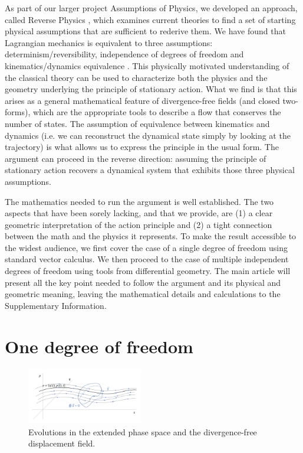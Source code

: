 \documentclass[fleqn,10pt]{wlscirep}
\begin{document}
As part of our larger project Assumptions of Physics, we developed an approach, called Reverse Physics \cite{aop-phys-ReversePhysics}, which examines current theories to find a set of starting physical assumptions that are sufficient to rederive them. We have found that Lagrangian mechanics is equivalent to three assumptions: determinism/reversibility, independence of degrees of freedom and kinematics/dynamics equivalence \cite{aop-phys-blueprint}. This physically motivated understanding of the classical theory can be used to characterize both the physics and the geometry underlying the principle of stationary action. What we find is that this arises as a general mathematical feature of divergence-free fields (and closed two-forms), which are the appropriate tools to describe a flow that conserves the number of states. The assumption of equivalence between kinematics and dynamics (i.e. we can reconstruct the dynamical state simply by looking at the trajectory) is what allows us to express the principle in the usual form. The argument can proceed in the reverse direction: assuming the principle of stationary action recovers a dynamical system that exhibits those three physical assumptions.

The mathematics needed to run the argument is well established\cite{souriau1970structure, abraham1978foundations,arnold1989mathematical, marsden1999introduction}. The two aspects that have been sorely lacking, and that we provide, are (1) a clear geometric interpretation of the action principle and (2) a tight connection between the math and the physics it represents. To make the result accessible to the widest audience, we first cover the case of a single degree of freedom using standard vector calculus. We then proceed to the case of multiple independent degrees of freedom using tools from differential geometry. The main article will present all the key point needed to follow the argument and its physical and geometric meaning, leaving the mathematical details and calculations to the Supplementary Information.

\section*{One degree of freedom}

\begin{figure}
	\includegraphics[width = 0.45\textwidth]{ExtendedPhaseSpace}
	\caption{\footnotesize{Evolutions in the extended phase space and the divergence-free displacement field.}}\label{extended_phase_space}
\end{figure}
\end{document}

